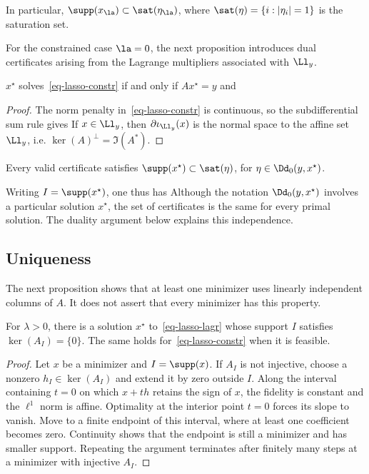 In particular, $\supp(x_\la) \subset \sat(\eta_\la)$, where $\sat(\eta)=\{i:|\eta_i|=1\}$ is the saturation set.

For the constrained case $\la=0$, the next proposition introduces dual certificates arising from the Lagrange multipliers associated with $\Ll_y$.

\begin{prop}\label{prop-first-order-constr}
	$x^\star$ solves~\eqref{eq-lasso-constr} if and only if $Ax^\star=y$ and
\end{prop}
\begin{proof}
The norm penalty in~\eqref{eq-lasso-constr} is continuous, so the subdifferential sum rule gives
If $x \in \Ll_y$, then $\partial \iota_{\Ll_y}(x)$ is the normal space to the affine set $\Ll_y$, i.e. $\ker(A)^\bot=\Im(A^*)$.
\end{proof}

Every valid certificate satisfies $\supp(x^\star) \subset \sat(\eta)$, for $\eta\in \Dd_0(y,x^\star)$.

Writing $I=\supp(x^\star)$, one thus has
Although the notation $\Dd_0(y,x^\star)$ involves a particular solution $x^\star$, the set of certificates is the same for every primal solution. The duality argument below explains this independence.

                                                                                  
\subsection{Uniqueness}

The next proposition shows that at least one minimizer uses linearly independent columns of $A$. It does not assert that every minimizer has this property.

\begin{prop}
	For $\lambda>0$, there is a solution $x^\star$ to~\eqref{eq-lasso-lagr} whose support $I$ satisfies $\ker(A_I)=\{0\}$. The same holds for~\eqref{eq-lasso-constr} when it is feasible.
\end{prop}

\begin{proof}
Let $x$ be a minimizer and $I=\supp(x)$. If $A_I$ is not injective, choose a nonzero $h_I\in\ker(A_I)$ and extend it by zero outside $I$. Along the interval containing $t=0$ on which $x+th$ retains the sign of $x$, the fidelity is constant and the $\ell^1$ norm is affine. Optimality at the interior point $t=0$ forces its slope to vanish. Move to a finite endpoint of this interval, where at least one coefficient becomes zero. Continuity shows that the endpoint is still a minimizer and has smaller support. Repeating the argument terminates after finitely many steps at a minimizer with injective $A_I$.
\end{proof}


